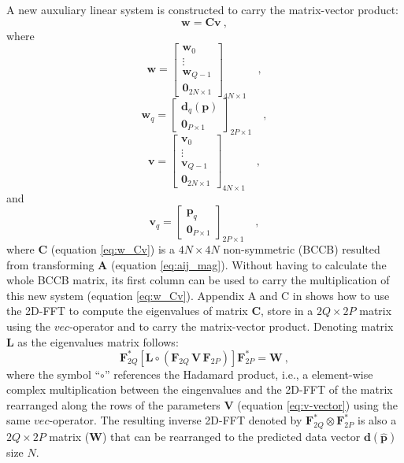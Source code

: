 A new auxuliary linear system is constructed to carry the matrix-vector product:
\begin{equation}
\mathbf{w} = \mathbf{C} \mathbf{v} \: ,
\label{eq:w_Cv}
\end{equation}
where
\begin{equation}
\mathbf{w} = \begin{bmatrix}
\mathbf{w}_{0} \\
\vdots \\
\mathbf{w}_{Q - 1} \\
\mathbf{0}_{2N \times 1}
\end{bmatrix}_{4N \times 1} \quad ,
\label{eq:w-vector}
\end{equation}
\begin{equation}
\mathbf{w}_{q} = \begin{bmatrix}
\mathbf{d}_{q}(\mathbf{p}) \\
\mathbf{0}_{P \times 1}
\end{bmatrix}_{2P \times 1}
\label{eq:wq-vector} \quad ,
\end{equation}
\begin{equation}
\mathbf{v} = \begin{bmatrix}
\mathbf{v}_{0} \\
\vdots \\
\mathbf{v}_{Q - 1} \\
\mathbf{0}_{2N \times 1}
\end{bmatrix}_{4N \times 1} \quad ,
\label{eq:v-vector}
\end{equation}
and
\begin{equation}
\mathbf{v}_{q} = \begin{bmatrix}
\mathbf{p}_{q} \\
\mathbf{0}_{P \times 1}
\end{bmatrix}_{2P \times 1}
\label{eq:vq-vector} \quad ,
\end{equation}
where $\mathbf{C}$ (equation \ref{eq:w_Cv}) is a $4N \times 4N$ non-symmetric (BCCB) resulted from transforming $\mathbf{A}$ (equation \ref{eq:aij_mag}). Without having to calculate the whole BCCB matrix, its first column can be used to carry the multiplication of this new system (equation \ref{eq:w_Cv}). Appendix A and C in \cite{takahashi2020convolutional} shows how to use the 2D-FFT to compute the eigenvalues of matrix $\mathbf{C}$, store in a $2Q \times 2P$ matrix using the $vec$-operator and to carry the matrix-vector product. Denoting matrix $\mathbf{L}$ as the eigenvalues matrix follows:
\begin{equation}
	\mathbf{F}_{2Q}^{\ast} \left[ 
	\mathbf{L} \circ \left(\mathbf{F}_{2Q} \, \mathbf{V} \, \mathbf{F}_{2P} \right) 
	\right] \mathbf{F}_{2P}^{\ast} = \mathbf{W} \: ,
	\label{eq:DFT-system}
\end{equation}
where the symbol ``$\circ$'' references the Hadamard product, i.e., a element-wise complex multiplication between the eingenvalues and the 2D-FFT of the matrix rearranged along the rows of the parameters $\mathbf{V}$ (equation \ref{eq:v-vector}) using the same $vec$-operator. The resulting inverse 2D-FFT denoted by $\mathbf{F}_{2Q}^{\ast}  \otimes \mathbf{F}_{2P}^{\ast}$ is also a $2Q \times 2P$ matrix ($\mathbf{W}$) that can be rearranged to the predicted data vector $\mathbf{d}(\hat{\mathbf{p}})$ size $N$.

